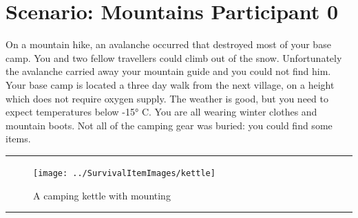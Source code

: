 \documentclass{article}
\begin{document}
    \section*{Scenario: \textmd{Mountains} \hfill Participant \textmd{0}}
    \Large On a mountain hike, an avalanche occurred that destroyed most of your base camp. You and two fellow travellers could climb out of the snow. Unfortunately the avalanche carried away your mountain guide and you could not find him. Your base camp is located a three day walk from the next village, on a height which does not require oxygen supply. The weather is good, but you need to expect temperatures below -15° C. You are all wearing winter clothes and mountain boots. Not all of the camping gear was buried: you could find some items.\clearpage
        \par\noindent\rule{\textwidth}{0.4pt}
    \begin{figure}[H]
        \centering
        \begin{minipage}{0.25\textwidth}
            \centering
            \texttt{[image: ../SurvivalItemImages/kettle]}
        \end{minipage}\hfill
        \begin{minipage}{0.7\textwidth}
            \centering
            \Large A camping kettle with mounting
        \end{minipage}
    \end{figure}
    \vspace{-0.8em}
    \noindent\rule{\textwidth}{0.4pt}
            
\end{document}
